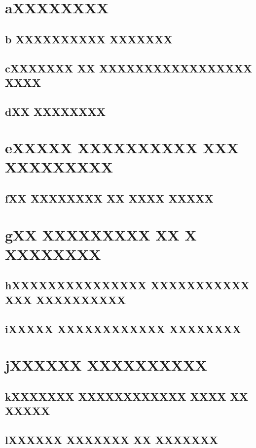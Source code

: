 \documentclass{acmart}
\begin{document}
\title{}
\begin{abstract} \end{abstract}
\maketitle
\section{aXXXXXXXX}\subsection{b XXXXXXXXXX XXXXXXX}\subsection{cXXXXXXX XX XXXXXXXXXXXXXXXXX XXXX}\subsection{dXX XXXXXXXX}
\section{eXXXXX XXXXXXXXXX XXX XXXXXXXXX}\subsection{fXX XXXXXXXX XX XXXX XXXXX}
\section{gXX XXXXXXXXX XX X XXXXXXXX}\subsection{hXXXXXXXXXXXXXXX XXXXXXXXXXX XXX XXXXXXXXXX}
\subsection{iXXXXX XXXXXXXXXXXX XXXXXXXX}
\section{jXXXXXX XXXXXXXXXX}\subsection{kXXXXXXX XXXXXXXXXXXX XXXX XX XXXXX}\subsection{lXXXXXX XXXXXXX XX XXXXXXX}
\end{document}

